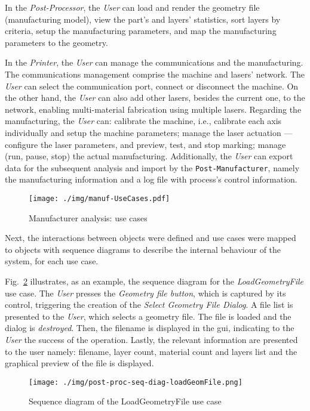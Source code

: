 In the
\emph{Post-Processor}, the \emph{User} can load and render the geometry file
(manufacturing model), view the part's and layers' statistics, sort layers by
criteria, setup the manufacturing parameters, and map the manufacturing
parameters to the geometry.

In the \emph{Printer}, the \emph{User} can manage the communications and the
manufacturing. The communications management comprise the machine and lasers'
network. The \emph{User} can select the communication port, connect or
disconnect the machine. On the other hand, the \emph{User} can also add other
lasers, besides the current one, to the network, enabling multi-material
fabrication using multiple lasers. Regarding the manufacturing, the \emph{User}
can: calibrate the machine, i.e., calibrate each axis individually and setup the
machine parameters; manage the laser actuation --- configure the laser
parameters, and preview, test, and stop marking; manage (run, pause, stop) the
actual manufacturing. Additionally, the \emph{User} can export data for the
subsequent analysis and import by the \texttt{Post-Manufacturer}, namely the
manufacturing information and a log file with process's control information.

\begin{figure}[!hbt]
  \centering
    \texttt{[image: ./img/manuf-UseCases.pdf]}
  \caption{Manufacturer analysis: use cases}\label{fig:manuf-usecases}
\end{figure}

Next, the interactions between objects were defined and use cases were mapped to
objects with sequence diagrams to describe the internal behaviour of the system,
for each use case.

Fig.~\ref{fig:post-proc-seq-diag-loadGeomFile} illustrates, as an example, the
sequence diagram for the \emph{LoadGeometryFile} use case.
The \emph{User} presses the \emph{Geometry file button}, which is captured by
its control, triggering the creation of the \emph{Select Geometry File Dialog}.
A file list is presented to the \emph{User}, which selects a geometry file. The
file is loaded and the dialog is \emph{destroyed}. Then, the filename is
displayed in the \gls{gui}, indicating to the \emph{User} the success of the
operation. Lastly, the relevant information are presented to the user namely:
filename, layer count, material count and layers list and the graphical preview
of the file is displayed.
% 
\begin{figure}[!hbt]
  \centering \texttt{[image: ./img/post-proc-seq-diag-loadGeomFile.png]}
  \caption{Sequence diagram of the LoadGeometryFile use case}\label{fig:post-proc-seq-diag-loadGeomFile}
\end{figure}
%

